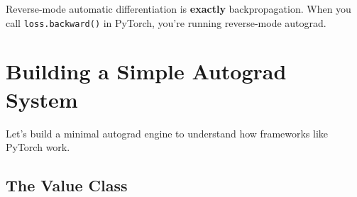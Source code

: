 \begin{important}
Reverse-mode automatic differentiation is \textbf{exactly} backpropagation. When you call \texttt{loss.backward()} in PyTorch, you're running reverse-mode autograd.
\end{important}

\section{Building a Simple Autograd System}

Let's build a minimal autograd engine to understand how frameworks like PyTorch work.

\subsection{The Value Class}

